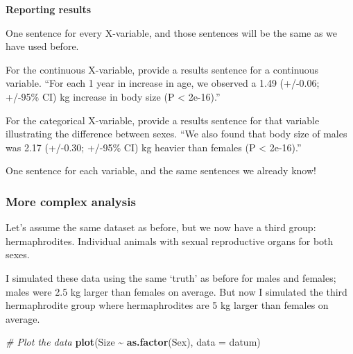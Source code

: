 \documentclass[
]{article}
\newenvironment{Shaded}{\begin{snugshade}}{\end{snugshade}}
\newcommand{\AttributeTok}[1]{\textcolor[rgb]{0.13,0.29,0.53}{#1}}
\newcommand{\CommentTok}[1]{\textcolor[rgb]{0.56,0.35,0.01}{\textit{#1}}}
\newcommand{\FunctionTok}[1]{\textcolor[rgb]{0.13,0.29,0.53}{\textbf{#1}}}
\newcommand{\NormalTok}[1]{#1}
\newcommand{\OtherTok}[1]{\textcolor[rgb]{0.56,0.35,0.01}{#1}}
\newcommand{\SpecialCharTok}[1]{\textcolor[rgb]{0.81,0.36,0.00}{\textbf{#1}}}
\newcommand{\StringTok}[1]{\textcolor[rgb]{0.31,0.60,0.02}{#1}}
\begin{document}
\textbf{Reporting results}

One sentence for every X-variable, and those sentences will be the same
as we have used before.

For the continuous X-variable, provide a results sentence for a
continuous variable. ``For each 1 year in increase in age, we observed a
1.49 (+/-0.06; +/-95\% CI) kg increase in body size (P \textless{}
2e-16).''

For the categorical X-variable, provide a results sentence for that
variable illustrating the difference between sexes. ``We also found that
body size of males was 2.17 (+/-0.30; +/-95\% CI) kg heavier than
females (P \textless{} 2e-16).''

One sentence for each variable, and the same sentences we already know!

\subsubsection{More complex analysis}\label{more-complex-analysis}

Let's assume the same dataset as before, but we now have a third group:
hermaphrodites. Individual animals with sexual reproductive organs for
both sexes.

\begin{Shaded}
\end{Shaded}

I simulated these data using the same `truth' as before for males and
females; males were 2.5 kg larger than females on average. But now I
simulated the third hermaphrodite group where hermaphrodites are 5 kg
larger than females on average.

\begin{Shaded}
\begin{Highlighting}[]
\CommentTok{\# Plot the data}
\FunctionTok{plot}\NormalTok{(Size }\SpecialCharTok{\textasciitilde{}} \FunctionTok{as.factor}\NormalTok{(Sex), }\AttributeTok{data =}\NormalTok{ datum)}
\end{Highlighting}
\end{Shaded}
\end{document}
